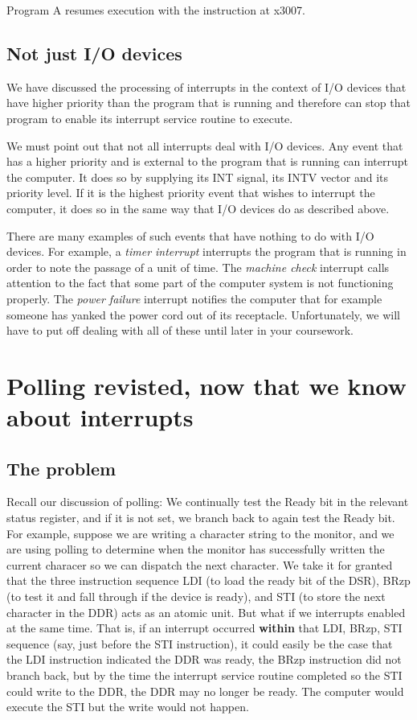 \documentclass{patt}
\begin{document}
Program A resumes execution with the instruction at x3007.

\FloatBarrier
\subsection{Not just I/O devices}

We have discussed the processing of interrupts in the context of I/O
devices that have higher priority than the program that is running and
therefore can stop that program to enable its interrupt service routine
to execute.  

We must point out that not all interrupts deal with I/O devices.  Any
event that has a higher priority and is external to the program that is
running can interrupt the computer.
It does so by supplying its INT signal, its INTV vector and its priority
level.  If it is the highest priority event that wishes to interrupt the
computer, it does so in the same way that I/O devices do as described above.

There are many examples of such events that have nothing to do with I/O 
devices.  For example, a {\em timer interrupt} interrupts the program that
is running in order to note the passage of a unit of time.  The {\em machine 
check} interrupt calls attention to the fact that some part of the computer 
system is not functioning properly.  The {\em power failure} interrupt notifies
the computer that for example someone has yanked the power cord out of its
receptacle.  Unfortunately, we will have to put off dealing with all of these 
until later in your coursework.

\section{Polling revisted, now that we know about interrupts}

\subsection{The problem}

Recall our discussion of polling: We continually test the Ready bit in the
relevant status register, and if it is not set, we branch back to again
test the Ready bit.  For example, suppose we are writing a character string to
the monitor, and we are using polling to determine when the monitor has
successfully written the current characer so we can dispatch the next
character.  We take it for granted that the three instruction sequence  
LDI (to load the ready bit of the DSR), BRzp (to test it and fall through 
if the device is ready), and STI (to store the next character in the DDR) 
acts as an atomic unit.  But what if we interrupts enabled 
at the same time.  That is, if an interrupt occurred {\bf within} that 
LDI, BRzp, 
STI sequence (say, just before the STI instruction), it could easily 
be the case that the LDI instruction indicated 
the DDR was ready, the BRzp instruction did not branch back, but by the time 
the interrupt service routine completed so the STI could write to the DDR,
the DDR may no longer be ready.  The computer would execute the STI but the
write would not happen.
\end{document}
